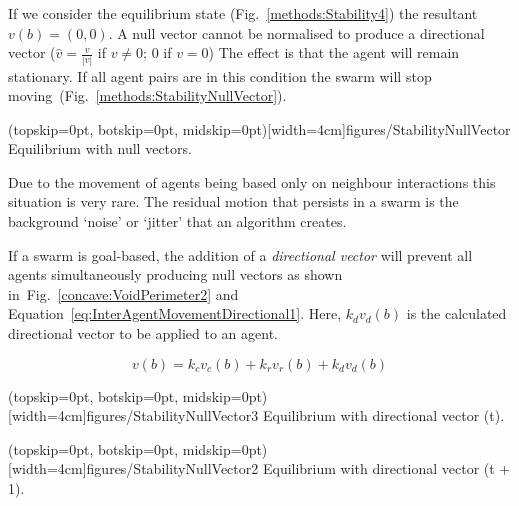 \documentclass{ieeeaccess}
\begin{document}
If we consider the equilibrium state (Fig.~\ref{methods:Stability4}) the resultant $v(b)=(0,0)$. A null vector cannot be normalised to produce a directional vector ($\hat{v} = \frac{v}{|v|}$ if $v\neq0$; $0$ if $v=0$) The effect is that the agent will remain stationary. If all agent pairs are in this condition the swarm will stop moving~(Fig.~\ref{methods:StabilityNullVector}).

\Figure[t!](topskip=0pt, botskip=0pt, midskip=0pt)[width=4cm]{figures/StabilityNullVector}
{Equilibrium with null vectors.\label{methods:StabilityNullVector}}


Due to the movement of agents being based only on neighbour interactions this situation is very rare. The residual motion that persists in a swarm is the background `noise' or `jitter' that an algorithm creates.

If a swarm is goal-based, the addition of a \textit{directional vector} will prevent all agents simultaneously producing null vectors as shown in~Fig.~\ref{concave:VoidPerimeter2} and Equation~\ref{eq:InterAgentMovementDirectional1}. Here, $k_dv_{d}(b)$ is the calculated directional vector to be applied to an agent.

\begin{equation}\label{eq:InterAgentMovementDirectional1}
v(b) = k_cv_{c}(b) + k_rv_{r}(b) + k_dv_{d}(b)
\end{equation}

\Figure[t!](topskip=0pt, botskip=0pt, midskip=0pt)[width=4cm]{figures/StabilityNullVector3}
{Equilibrium with directional vector (t).\label{concave:VoidPerimeter1}}


\Figure[t!](topskip=0pt, botskip=0pt, midskip=0pt)[width=4cm]{figures/StabilityNullVector2}
{Equilibrium with directional vector (t + 1).\label{concave:VoidPerimeter2}}
\end{document}
